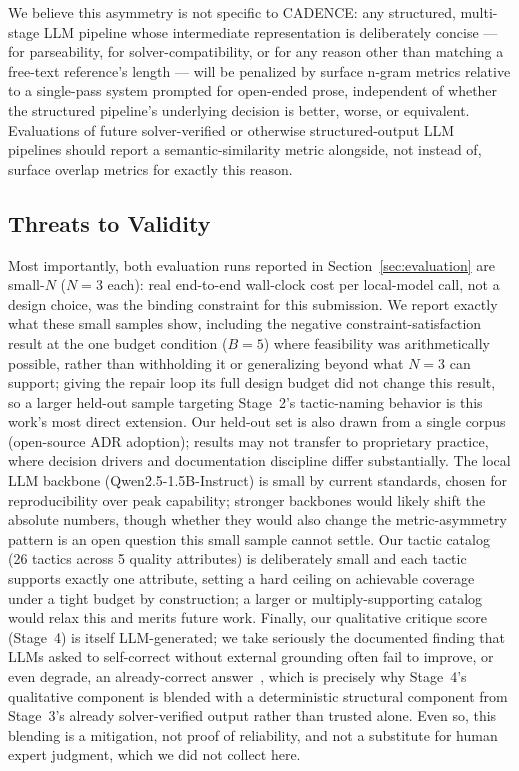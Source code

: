\documentclass[lettersize,journal]{IEEEtran}
\begin{document}
We believe this asymmetry is not specific to CADENCE: any structured, multi-stage LLM pipeline whose intermediate representation is deliberately concise --- for parseability, for solver-compatibility, or for any reason other than matching a free-text reference's length --- will be penalized by surface n-gram metrics relative to a single-pass system prompted for open-ended prose, independent of whether the structured pipeline's underlying decision is better, worse, or equivalent. Evaluations of future solver-verified or otherwise structured-output LLM pipelines should report a semantic-similarity metric alongside, not instead of, surface overlap metrics for exactly this reason.

\subsection{Threats to Validity}

Most importantly, both evaluation runs reported in Section~\ref{sec:evaluation} are small-$N$ ($N=3$ each): real end-to-end wall-clock cost per local-model call, not a design choice, was the binding constraint for this submission. We report exactly what these small samples show, including the negative constraint-satisfaction result at the one budget condition ($B=5$) where feasibility was arithmetically possible, rather than withholding it or generalizing beyond what $N=3$ can support; giving the repair loop its full design budget did not change this result, so a larger held-out sample targeting Stage~2's tactic-naming behavior is this work's most direct extension. Our held-out set is also drawn from a single corpus (open-source ADR adoption); results may not transfer to proprietary practice, where decision drivers and documentation discipline differ substantially. The local LLM backbone (Qwen2.5-1.5B-Instruct) is small by current standards, chosen for reproducibility over peak capability; stronger backbones would likely shift the absolute numbers, though whether they would also change the metric-asymmetry pattern is an open question this small sample cannot settle. Our tactic catalog (26 tactics across 5 quality attributes) is deliberately small and each tactic supports exactly one attribute, setting a hard ceiling on achievable coverage under a tight budget by construction; a larger or multiply-supporting catalog would relax this and merits future work. Finally, our qualitative critique score (Stage~4) is itself LLM-generated; we take seriously the documented finding that LLMs asked to self-correct without external grounding often fail to improve, or even degrade, an already-correct answer~\cite{huang2024selfcorrect}, which is precisely why Stage~4's qualitative component is blended with a deterministic structural component from Stage~3's already solver-verified output rather than trusted alone. Even so, this blending is a mitigation, not proof of reliability, and not a substitute for human expert judgment, which we did not collect here.
\end{document}
